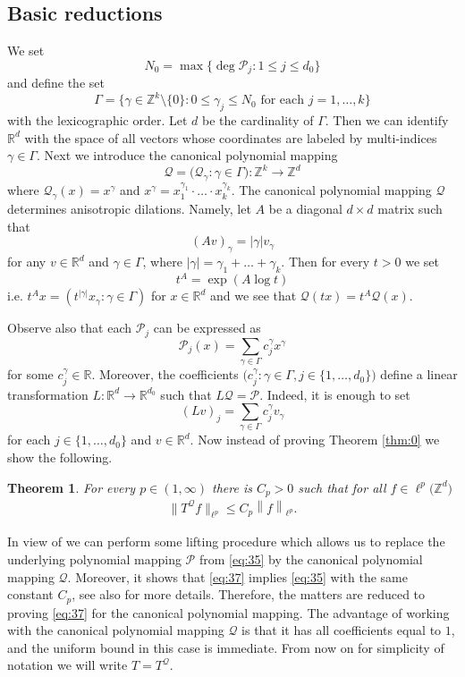 \documentclass[a4paper,oneside]{amsart}
\theoremstyle{plain}
\theoremstyle{definition}
\numberwithin{equation}{section}
\newcounter{thm}
\theoremstyle{plain}
\newtheorem{main_theorem}[thm]{Theorem}
\newcommand{\RR}{\mathbb{R}}
\newcommand{\ZZ}{\mathbb{Z}}
\newcommand{\calP}{\mathcal{P}}
\newcommand{\calQ}{\mathcal{Q}}
\newcommand{\seq}[2]{{#1}: {#2}}
\newcommand{\abs}[1]{{\lvert {#1} \rvert}}
\newcommand{\vnorm}[1]{{\left\lVert {#1} \right\rVert}}
\newcommand{\8}{\infty}
\begin{document}
\subsection{Basic reductions}
We set 
\[
N_0 = \max\{ \deg \calP_j : 1 \leq j \leq d_0\}
\]
and  define
the set
\[
\Gamma =
\big\{
	\gamma \in \ZZ^k \setminus\{0\} : 0 \leq \gamma_j \leq N_0
	\text{ for each } j = 1, \ldots, k
\big\}
\]
with the lexicographic order. Let $d$ be the cardinality of $\Gamma$. Then we can identify
$\RR^d$ with the space of all vectors whose coordinates are labeled by
multi-indices $\gamma \in \Gamma$.
Next we
introduce the canonical polynomial mapping
$$
\calQ = \big(\seq{\calQ_\gamma}{\gamma \in \Gamma}\big) : \ZZ^k \rightarrow \ZZ^d
$$
where $\calQ_\gamma(x) = x^\gamma$ and $x^\gamma=x_1^{\gamma_1}\cdot\ldots\cdot x_k^{\gamma_k}$.
The canonical polynomial mapping $\calQ$ determines anisotropic
dilations. Namely, let $A$ be 
 a diagonal $d \times d$
matrix such that
$$
(A v)_\gamma = \abs{\gamma} v_\gamma
$$
for any $v\in\RR^d$ and $\gamma\in\Gamma$, where $|\gamma|=\gamma_1+\ldots+\gamma_k$. Then for every $t > 0$ we set
$$
t^{A}=\exp(A\log t)
$$
i.e. $t^A x=(t^{|\gamma|}x_{\gamma}: \gamma\in \Gamma)$ for
$x\in\RR^d$ and we see that  $\calQ(tx)=t^A\calQ(x)$.  




 Observe also that each $\calP_j$ can be expressed as
$$
\calP_j(x) = \sum_{\gamma \in \Gamma} c_j^\gamma x^\gamma
$$
for some $c_j^\gamma \in \RR$. Moreover, the coefficients
$\big(\seq{c_j^\gamma}{\gamma \in \Gamma, j \in \{1, \ldots,
  d_0\}}\big)$ define a linear transformation $L: \RR^d \rightarrow
\RR^{d_0}$ such that $L\calQ = \calP$. Indeed, it is enough to set
$$
(L v)_j = \sum_{\gamma \in \Gamma} c_j^\gamma v_\gamma
$$
for each $j \in \{1, \ldots, d_0\}$ and $v \in \RR^d$. Now instead of
proving Theorem \ref{thm:0} we show the following. 
\begin{main_theorem}
\label{thm:7}
        For every $p \in (1, \infty)$ there is $C_p > 0$ such that for all
		$f \in \ell^p\big(\ZZ^{d}\big)$
                \begin{align}
\label{eq:37}
		\big\lVert
		T^\calQ f 
		\big\rVert_{\ell^p}
		\leq
		C_p \vnorm{f}_{\ell^p}.
                \end{align}
\end{main_theorem}
In view of \cite[Section 11]{bigs} we can perform some
lifting procedure which allows us to replace the underlying polynomial
mapping $\calP$ from \eqref{eq:35} by the canonical polynomial mapping
$\calQ$. Moreover, it shows  that
\eqref{eq:37} implies \eqref{eq:35} with the same constant
$C_p$, see also \cite{iw} for more details. Therefore, the matters are reduced to proving \eqref{eq:37} for
the canonical polynomial mapping.  The advantage of working with the
canonical polynomial mapping $\calQ$ is that it has all coefficients
equal to $1$, and the uniform bound in this case is immediate.  From
now on for simplicity of notation we will write $T=T^{\calQ}$.
\end{document}
